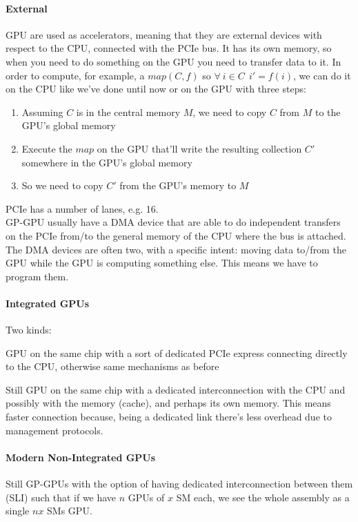 \documentclass[10pt]{report}
\begin{document}
\paragraph{External} GPU are used as accelerators, meaning that they are external devices with respect to the CPU, connected with the PCIe bus. It has its own memory, so when you need to do something on the GPU you need to transfer data to it. In order to compute, for example, a $map(C,f)$ so $\forall\:i\in C\:\:i'=f(i)$, we can do it on the CPU like we've done until now or on the GPU with three steps:
\begin{enumerate}
	\item Assuming $C$ is in the central memory $M$, we need to copy $C$ from $M$ to the GPU's global memory
	\item Execute the $map$ on the GPU that'll write the resulting collection $C'$ somewhere in the GPU's global memory
	\item So we need to copy $C'$ from the GPU's memory to $M$
\end{enumerate}
PCIe has a number of lanes, e.g. 16.\\
GP-GPU usually have a DMA device that are able to do independent transfers on the PCIe from/to the general memory of the CPU where the bus is attached. The DMA devices are often two, with a specific intent: moving data to/from the GPU while the GPU is computing something else. This means we have to program them.
\paragraph{Integrated GPUs} Two kinds:
\begin{list}{}{}
	\item GPU on the same chip with a sort of dedicated PCIe express connecting directly to the CPU, otherwise same mechanisms as before
	\item Still GPU on the same chip with a dedicated interconnection with the CPU and possibly with the memory (cache), and perhaps its own memory. This means faster connection because, being a dedicated link there's less overhead due to management protocols.
\end{list}
\paragraph{Modern Non-Integrated GPUs} Still GP-GPUs with the option of having dedicated interconnection between them (SLI) such that if we have $n$ GPUs of $x$ SM each, we see the whole assembly as a single $nx$ SMs GPU.
\end{document}
